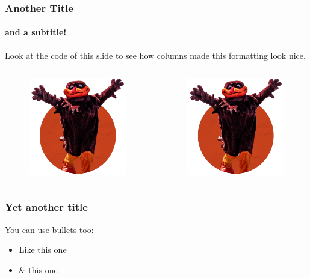 \documentclass[
    11pt, %
    aspectratio=169, %
]{beamer}
\begin{document}
\begin{frame}
	\frametitle{Another Title}
	\framesubtitle{and a subtitle!}
	
	Look at the code of this slide to see how columns made this formatting look nice.

	\begin{columns}[t] %
		\begin{column}{0.5\textwidth} %
                \begin{figure}[h!] 
                    \centering
                    \includegraphics[angle=0, width=4.5cm]{Hokie2.png}
                \end{figure}
		\end{column}
  		\begin{column}{0.5\textwidth} %
                \begin{figure}[h!]
                    \centering
                    \includegraphics[angle=0, width=4.5cm]{Hokie2.png}
                \end{figure}
		\end{column}		
	\end{columns}
\end{frame}

\begin{frame}
	\frametitle{Yet another title}
            You can use bullets too:\newline
            \begin{itemize}
                \item Like this one\newline
                \item \& this one
            \end{itemize}
\end{frame}
\end{document}
